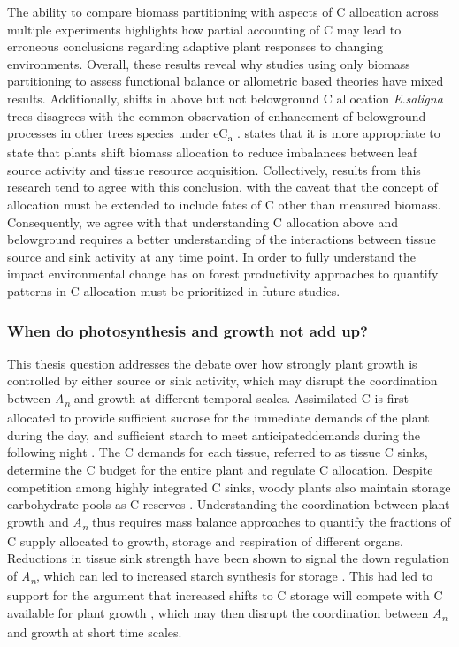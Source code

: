 \documentclass[a4paper]{article}
\begin{document}
The ability to compare biomass partitioning with aspects of C allocation across multiple experiments highlights how partial accounting of C may lead to erroneous conclusions regarding adaptive plant responses to changing environments. Overall, these results reveal why studies using only biomass partitioning to assess functional balance or allometric based theories have mixed results. Additionally, shifts in above but not belowground C allocation \textit{E.saligna} trees disagrees with the common observation of enhancement of belowground processes in other trees species under eC\textsubscript{a} \citep[see]{palmroth2006aboveground, iversen2014terrestrial}. \citet{shipley2002balanced} states that it is more appropriate to state that plants shift biomass allocation to reduce imbalances between leaf source activity and tissue resource acquisition. Collectively, results from this research tend to agree with this conclusion, with the caveat that the concept of allocation must be extended to include fates of C other than measured biomass. Consequently, we agree with \citet{poorter2012biomass} that understanding C allocation above and belowground requires a better understanding of the interactions between tissue source and sink activity at any time point. In order to fully understand the impact environmental change has on forest productivity approaches to quantify patterns in C allocation must be prioritized in future studies.

\subsubsection*{When do photosynthesis and growth not add up?}

This thesis question addresses the debate over how strongly plant growth is controlled by either source or sink activity, which may disrupt the coordination between \textit{A\textsubscript{n}} and growth at different temporal scales. Assimilated C is first allocated to provide sufficient sucrose for the immediate demands of the plant during the day, and sufficient starch to meet \textquotesingle anticipated\textquotesingle demands during the following night \citep{smith2007coordination}. The C demands for each tissue, referred to as tissue C sinks, determine the C budget for the entire plant and regulate C allocation. Despite competition among highly integrated C sinks, woody plants also maintain storage carbohydrate pools as C reserves \citep{kozlowski1992carbohydrate}. Understanding the coordination between plant growth and \textit{A\textsubscript{n}} thus requires mass balance approaches to quantify the fractions of C supply allocated to growth, storage and respiration of different organs. Reductions in tissue sink strength have been shown to signal the down regulation of \textit{A\textsubscript{n}}, which can led to increased starch synthesis for storage \citep{sage1994acclimation, kitao2007interaction}. This had led to support for the argument that increased shifts to C storage will compete with C available for plant growth \citep{chapin1990ecology}, which may then disrupt the coordination between \textit{A\textsubscript{n}} and growth at short time scales.
\end{document}
